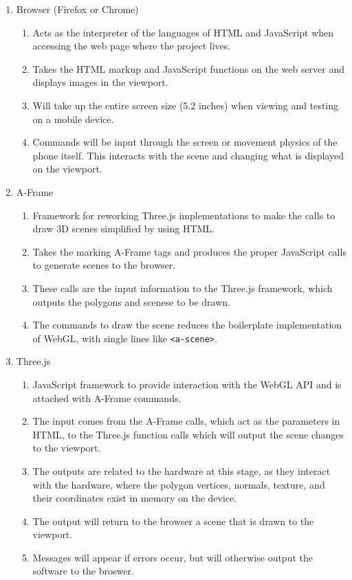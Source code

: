 \documentclass[letterpaper,10pt,titlepage,draftclsnofoot,onecolumn,compsoc,utf8,latin1]{IEEEtran}
\begin{document}
\begin{singlespace}
\begin{singlespace}
\begin{enumerate}[labelsep=2em,leftmargin=.5in]
    \item Browser (Firefox or Chrome)
    \begin{enumerate}[leftmargin=*,labelindent=0pt]
        \item Acts as the interpreter of the languages of HTML and JavaScript when accessing the web page where the project lives.
        \item Takes the HTML markup and JavaScript functions on the web server and displays images in the viewport.
        \item Will take up the entire screen size (5.2 inches) when viewing and testing on a mobile device.
        \item Commands will be input through the screen or movement physics of the phone itself. This interacts with the scene and changing what is displayed on the viewport.
    \end{enumerate}
    \item A-Frame
    \begin{enumerate}[leftmargin=*,labelindent=0pt]
        \item Framework for reworking Three.js implementations to make the calls to draw 3D scenes simplified by using HTML.
        \item Takes the marking A-Frame tags and produces the proper JavaScript calls to generate scenes to the browser.
        \item These calls are the input information to the Three.js framework, which outputs the polygons and scenese to be drawn.
        \item The commands to draw the scene reduces the boilerplate implementation of WebGL, with single lines like \texttt{<a-scene>}.
    \end{enumerate}
    \item Three.js
    \begin{enumerate}[leftmargin=*,labelindent=0pt]
        \item JavaScript framework to provide interaction with the WebGL API and is attached with A-Frame commands.
        \item The input comes from the A-Frame calls, which act as the parameters in HTML, to the Three.js function calls which will output the scene changes to the viewport.
        \item The outputs are related to the hardware at this stage, as they interact with the hardware, where the polygon vertices, normals, texture, and their coordinates exist in memory on the device.
        \item The output will return to the browser a scene that is drawn to the viewport.
        \item Messages will appear if errors occur, but will otherwise output the software to the broswer.
    \end{enumerate}
\end{enumerate}


\end{singlespace}
\end{singlespace}
\end{document}
